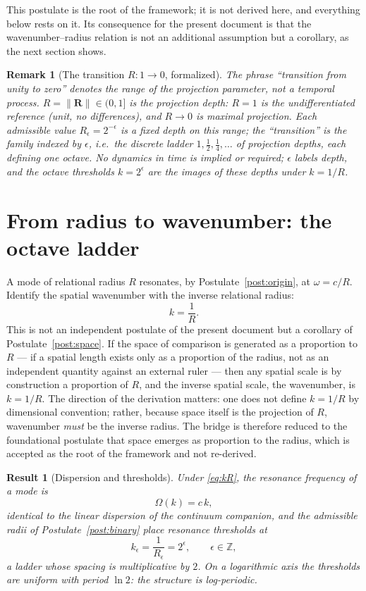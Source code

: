 \documentclass[11pt,a4paper]{article}
\newtheorem{theorem}{Result}
\newtheorem{remark}{Remark}
\begin{document}
This postulate is the root of the framework; it is not derived here, and everything below rests on it. Its consequence for the present document is that the wavenumber--radius relation is not an additional assumption but a corollary, as the next section shows.

\begin{remark}[The transition $R:1\to0$, formalized]\label{rem:transition}
The phrase ``transition from unity to zero'' denotes the range of the projection parameter, not a temporal process. $R=\|\mathbf R\|\in(0,1]$ is the projection depth: $R=1$ is the undifferentiated reference (unit, no differences), and $R\to0$ is maximal projection. Each admissible value $R_\epsilon=2^{-\epsilon}$ is a fixed depth on this range; the ``transition'' is the family indexed by $\epsilon$, i.e.\ the discrete ladder $1,\tfrac12,\tfrac14,\dots$ of projection depths, each defining one octave. No dynamics in time is implied or required; $\epsilon$ labels depth, and the octave thresholds $k=2^\epsilon$ are the images of these depths under $k=1/R$.
\end{remark}

\section{From radius to wavenumber: the octave ladder}\label{sec:ladder}

A mode of relational radius $R$ resonates, by Postulate~\ref{post:origin}, at $\omega=c/R$. Identify the spatial wavenumber with the inverse relational radius:
\begin{equation}\label{eq:kR}
k=\frac1R .
\end{equation}
This is not an independent postulate of the present document but a corollary of Postulate~\ref{post:space}. If the space of comparison is generated as a proportion to $R$ --- if a spatial length exists only as a proportion of the radius, not as an independent quantity against an external ruler --- then any spatial scale is by construction a proportion of $R$, and the inverse spatial scale, the wavenumber, is $k=1/R$. The direction of the derivation matters: one does not define $k=1/R$ by dimensional convention; rather, because space itself is the projection of $R$, wavenumber \emph{must} be the inverse radius. The bridge is therefore reduced to the foundational postulate that space emerges as proportion to the radius, which is accepted as the root of the framework and not re-derived.

\begin{theorem}[Dispersion and thresholds]\label{res:disp}
Under \eqref{eq:kR}, the resonance frequency of a mode is
\[
\Omega(k)=c\,k,
\]
identical to the linear dispersion of the continuum companion, and the admissible radii of Postulate~\ref{post:binary} place resonance thresholds at
\[
k_\epsilon = \frac{1}{R_\epsilon}=2^{\epsilon},\qquad \epsilon\in\mathbb{Z},
\]
a ladder whose spacing is multiplicative by $2$. On a logarithmic axis the thresholds are uniform with period $\ln 2$: the structure is log-periodic.
\end{theorem}
\end{document}
